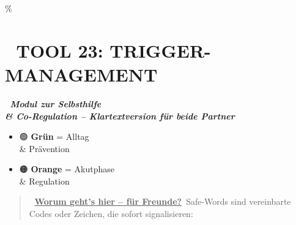 \hypertarget{tool-23-trigger-management}{\%
\section{\texorpdfstring{📄 \textbf{TOOL 23: TRIGGER-MANAGEMENT}}{📄 TOOL 23: TRIGGER-MANAGEMENT}}\label{tool-23-trigger-management}}

🧩 \emph{\textbf{Modul zur Selbsthilfe \\\& Co-Regulation -- Klartextversion für beide Partner}}

\begin{itemize}
\item
  🟢 \textbf{Grün} = Alltag \\\& Prävention
\item
  🟠 \textbf{Orange} = Akutphase \\\& Regulation
\end{itemize}

\begin{quote}
🧠 \textbf{\ul{Worum geht's hier -- für Freunde?}}\
Safe-Words sind vereinbarte Codes oder Zeichen, die sofort signalisieren:
\end{quote}